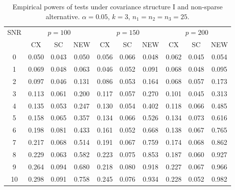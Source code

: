 \documentclass[12pt]{article} %
\theoremstyle{definition}
\begin{document}
\begin{table}[!hbp]
    \caption{Empirical powers of tests under covariance structure I and non-sparse alternative. $\alpha=0.05$, $k=3$, $n_1=n_2=n_3=25$. }
    \label{table2}
\centering
\begin{tabular}{*{10}{c}}
\toprule
\multirow{2}{*}{SNR} &\multicolumn{3}{c}{$p=100$}&\multicolumn{3}{c}{$p=150$}&\multicolumn{3}{c}{$p=200$} \\
    \cmidrule(r){2-4}\cmidrule(r){5-7}\cmidrule(r){8-10}
        & CX & SC & NEW & CX &SC &NEW &CX & SC & NEW\\
\midrule
0 & 0.050 & 0.043 & 0.050 & 0.056 & 0.066 & 0.048 & 0.062 & 0.045 & 0.054 \\ 
1 & 0.069 & 0.048 & 0.063 & 0.046 & 0.052 & 0.091 & 0.068 & 0.048 & 0.095 \\ 
2 & 0.097 & 0.046 & 0.131 & 0.086 & 0.053 & 0.164 & 0.068 & 0.057 & 0.173 \\ 
3 & 0.113 & 0.061 & 0.200 & 0.117 & 0.057 & 0.270 & 0.101 & 0.045 & 0.313 \\ 
4 & 0.135 & 0.053 & 0.247 & 0.130 & 0.054 & 0.402 & 0.118 & 0.066 & 0.485 \\ 
5 & 0.158 & 0.065 & 0.357 & 0.134 & 0.066 & 0.526 & 0.134 & 0.073 & 0.616 \\ 
6 & 0.198 & 0.081 & 0.433 & 0.161 & 0.052 & 0.668 & 0.138 & 0.067 & 0.765 \\ 
7 & 0.217 & 0.068 & 0.514 & 0.191 & 0.067 & 0.759 & 0.174 & 0.068 & 0.862 \\ 
8 & 0.229 & 0.063 & 0.582 & 0.223 & 0.075 & 0.853 & 0.187 & 0.060 & 0.927 \\ 
9 & 0.264 & 0.094 & 0.680 & 0.218 & 0.080 & 0.918 & 0.227 & 0.067 & 0.966 \\ 
10 & 0.298 & 0.091 & 0.758 & 0.245 & 0.076 & 0.934 & 0.228 & 0.052 & 0.982 \\ 
\bottomrule
\end{tabular}
\end{table}
\end{document}
